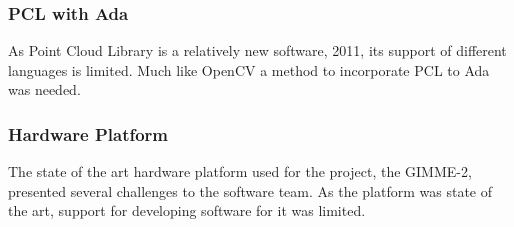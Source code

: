 \subsubsection{PCL with Ada}
As Point Cloud Library is a relatively new software, 2011, \cite{Rusu_ICRA2011_PCL} its support of different languages is limited. Much like OpenCV a method to incorporate PCL to Ada was needed.

\subsubsection{Hardware Platform}
The state of the art hardware platform used for the project, the GIMME-2, presented several challenges to the software team. As the platform was state of the art, support for developing software for it was limited.

